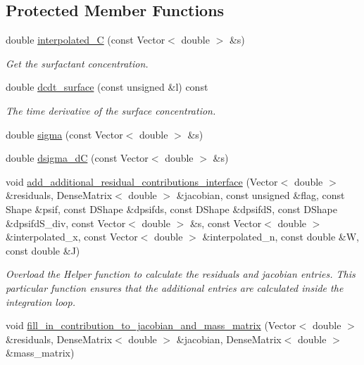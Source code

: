 \subsection*{Protected Member Functions}
\begin{DoxyCompactItemize}
\item 
double \hyperlink{classoomph_1_1SurfactantTransportInterfaceElement_a9da12df06b20e5f1ce0736acfc7e8d83}{interpolated\+\_\+C} (const Vector$<$ double $>$ \&s)
\begin{DoxyCompactList}\small\item\em Get the surfactant concentration. \end{DoxyCompactList}\item 
double \hyperlink{classoomph_1_1SurfactantTransportInterfaceElement_a7b5cc851b94d836a3caa2130cbf45bec}{dcdt\+\_\+surface} (const unsigned \&l) const
\begin{DoxyCompactList}\small\item\em The time derivative of the surface concentration. \end{DoxyCompactList}\item 
double \hyperlink{classoomph_1_1SurfactantTransportInterfaceElement_a1710057c610ccccc06ef41f34f086aae}{sigma} (const Vector$<$ double $>$ \&s)
\item 
double \hyperlink{classoomph_1_1SurfactantTransportInterfaceElement_ad39e6040101db7d9338928b3c2343623}{dsigma\+\_\+dC} (const Vector$<$ double $>$ \&s)
\item 
void \hyperlink{classoomph_1_1SurfactantTransportInterfaceElement_adedf33390efdf652e169f8bd38eb2350}{add\+\_\+additional\+\_\+residual\+\_\+contributions\+\_\+interface} (Vector$<$ double $>$ \&residuals, Dense\+Matrix$<$ double $>$ \&jacobian, const unsigned \&flag, const Shape \&psif, const D\+Shape \&dpsifds, const D\+Shape \&dpsifdS, const D\+Shape \&dpsifd\+S\+\_\+div, const Vector$<$ double $>$ \&s, const Vector$<$ double $>$ \&interpolated\+\_\+x, const Vector$<$ double $>$ \&interpolated\+\_\+n, const double \&W, const double \&J)
\begin{DoxyCompactList}\small\item\em Overload the Helper function to calculate the residuals and jacobian entries. This particular function ensures that the additional entries are calculated inside the integration loop. \end{DoxyCompactList}\item 
void \hyperlink{classoomph_1_1SurfactantTransportInterfaceElement_a7c0f9b63cea887a4a65abbe9aeb3b3cf}{fill\+\_\+in\+\_\+contribution\+\_\+to\+\_\+jacobian\+\_\+and\+\_\+mass\+\_\+matrix} (Vector$<$ double $>$ \&residuals, Dense\+Matrix$<$ double $>$ \&jacobian, Dense\+Matrix$<$ double $>$ \&mass\+\_\+matrix)
\end{DoxyCompactItemize}
